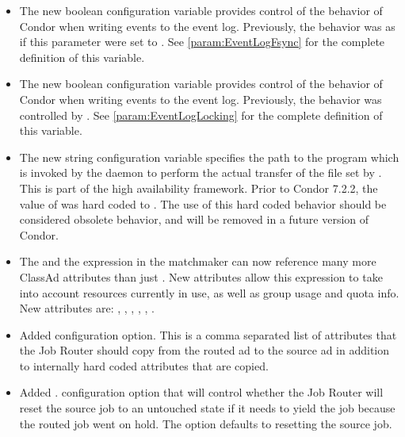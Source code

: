 \begin{itemize}

\item The new boolean configuration variable
   provides control of the behavior of
  Condor when writing events to the event log.  Previously,
  the behavior was as if this parameter were set to .
  See \ref{param:EventLogFsync} for the complete definition of
  this variable.

\item The new boolean configuration variable
   provides control of the behavior of
  Condor when writing events to the event log.  Previously,
  the behavior was controlled by .
  See \ref{param:EventLogLocking} for the complete definition of
  this variable.

\item The new string configuration variable 
  specifies the path to the  program which is
  invoked by the  daemon to perform the actual
  transfer of the file set by .
  This is part of the high availability framework.
  Prior to Condor 7.2.2, the value of  was hard coded to
  .  The use of
  this hard coded behavior should be considered obsolete behavior, and
  will be removed in a future version of Condor.

\item The  and the 
  expression in the matchmaker can now reference many more ClassAd
  attributes than just .  New attributes allow
  this expression to take into account resources currently in use, as
  well as group usage and quota info.  New attributes are:
  ,
  ,
  , ,
  ,
  .

\item Added  configuration
  option. This is a comma separated list of attributes that the Job
  Router should copy from the routed ad to the source ad in addition
  to internally hard coded attributes that are copied.

\item Added . configuration
  option that will control whether the Job Router will reset the
  source job to an untouched state if it needs to yield the job
  because the routed job went on hold.  The option defaults to
  resetting the source job.


\end{itemize}
